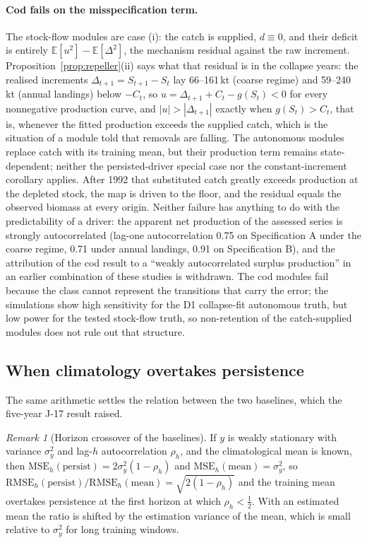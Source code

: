 \documentclass[preprint,11pt,authoryear]{elsarticle}
\theoremstyle{definition}
\theoremstyle{remark}
\newtheorem{remark}{Remark}
\newcommand{\RMSE}{\mathrm{RMSE}}
\newcommand{\MSE}{\mathrm{MSE}}
\newcommand{\pers}{\mathrm{persist}}
\newcommand{\E}{\mathbb{E}}
\begin{document}
\paragraph{Cod fails on the misspecification term.} The stock-flow modules are case (i): the catch is supplied, $d\equiv0$, and their deficit is entirely $\E[u^2]-\E[\Delta^2]$, the mechanism residual against the raw increment. Proposition~\ref{prop:repeller}(ii) says what that residual is in the collapse years: the realised increments $\Delta_{t+1}=S_{t+1}-S_t$ lay 66--161\,kt (coarse regime) and 59--240\,kt (annual landings) below $-C_t$, so $u=\Delta_{t+1}+C_t-g(S_t)<0$ for every nonnegative production curve, and $|u|>|\Delta_{t+1}|$ exactly when $g(S_t)>C_t$, that is, whenever the fitted production exceeds the supplied catch, which is the situation of a module told that removals are falling. The autonomous modules replace catch with its training mean, but their production term remains state-dependent; neither the persisted-driver special case nor the constant-increment corollary applies. After 1992 that substituted catch greatly exceeds production at the depleted stock, the map is driven to the floor, and the residual equals the observed biomass at every origin. Neither failure has anything to do with the predictability of a driver: the apparent net production of the assessed series is strongly autocorrelated (lag-one autocorrelation 0.75 on Specification A under the coarse regime, 0.71 under annual landings, 0.91 on Specification B), and the attribution of the cod result to a ``weakly autocorrelated surplus production'' in an earlier combination of these studies is withdrawn. The cod modules fail because the class cannot represent the transitions that carry the error; the simulations show high sensitivity for the D1 collapse-fit autonomous truth, but low power for the tested stock-flow truth, so non-retention of the catch-supplied modules does not rule out that structure.

\subsection{When climatology overtakes persistence}\label{sec:crossover}

The same arithmetic settles the relation between the two baselines, which the five-year J-17 result raised.

\begin{remark}[Horizon crossover of the baselines]\label{rem:crossover}
If $y$ is weakly stationary with variance $\sigma_y^2$ and lag-$h$ autocorrelation $\rho_h$, and the climatological mean is known, then $\MSE_h(\pers)=2\sigma_y^2(1-\rho_h)$ and $\MSE_h(\mathrm{mean})=\sigma_y^2$, so $\RMSE_h(\pers)/\RMSE_h(\mathrm{mean})=\sqrt{2(1-\rho_h)}$ and the training mean overtakes persistence at the first horizon at which $\rho_h<\tfrac12$. With an estimated mean the ratio is shifted by the estimation variance of the mean, which is small relative to $\sigma_y^2$ for long training windows.
\end{remark}
\end{document}
